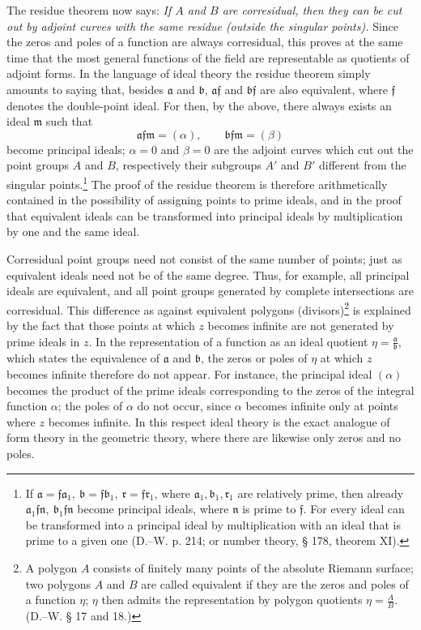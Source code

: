 \documentclass[11pt]{article}
\providecommand{\fra}{\mathfrak a}
\providecommand{\frb}{\mathfrak b}
\providecommand{\frf}{\mathfrak f}
\providecommand{\frr}{\mathfrak r}
\providecommand{\frm}{\mathfrak m}
\begin{document}
The residue theorem now says: \emph{If \(A\) and \(B\) are corresidual, then they can be cut out by adjoint curves with the same residue (outside the singular points).} Since the zeros and poles of a function are always corresidual, this proves at the same time that the most general functions of the field are representable as quotients of adjoint forms. In the language of ideal theory the residue theorem simply amounts to saying that, besides \(\fra\) and \(\frb\), \(\fra\frf\) and \(\frb\frf\) are also equivalent, where \(\frf\) denotes the double-point ideal. For then, by the above, there always exists an ideal \(\frm\) such that
\[
\fra\frf\frm=(\alpha),\qquad \frb\frf\frm=(\beta)
\]
become principal ideals; \(\alpha=0\) and \(\beta=0\) are the adjoint curves which cut out the point groups \(A\) and \(B\), respectively their subgroups \(A'\) and \(B'\) different from the singular points.\footnote{If \(\fra=\frf\fra_1,\ \frb=\frf\frb_1,\ \frr=\frf\frr_1\), where \(\fra_1,\frb_1,\frr_1\) are relatively prime, then already \(\fra_1\frf\mathfrak n,\ \frb_1\frf\mathfrak n\) become principal ideals, where \(\mathfrak n\) is prime to \(\frf\). For every ideal can be transformed into a principal ideal by multiplication with an ideal that is prime to a given one (D.--W. p. 214; or number theory, § 178, theorem XI).} The proof of the residue theorem is therefore arithmetically contained in the possibility of assigning points to prime ideals, and in the proof that equivalent ideals can be transformed into principal ideals by multiplication by one and the same ideal.

Corresidual point groups need not consist of the same number of points; just as equivalent ideals need not be of the same degree. Thus, for example, all principal ideals are equivalent, and all point groups generated by complete intersections are corresidual. This difference as against equivalent polygons (divisors)\footnote{A polygon \(A\) consists of finitely many points of the absolute Riemann surface; two polygons \(A\) and \(B\) are called equivalent if they are the zeros and poles of a function \(\eta\); \(\eta\) then admits the representation by polygon quotients \(\eta=\frac{A}{B}\). (D.--W. § 17 and 18.)} is explained by the fact that those points at which \(z\) becomes infinite are not generated by prime ideals in \(z\). In the representation of a function as an ideal quotient \(\eta=\frac{\fra}{\frb}\), which states the equivalence of \(\fra\) and \(\frb\), the zeros or poles of \(\eta\) at which \(z\) becomes infinite therefore do not appear. For instance, the principal ideal \((\alpha)\) becomes the product of the prime ideals corresponding to the zeros of the integral function \(\alpha\); the poles of \(\alpha\) do not occur, since \(\alpha\) becomes infinite only at points where \(z\) becomes infinite. In this respect ideal theory is the exact analogue of form theory in the geometric theory, where there are likewise only zeros and no poles.
\end{document}
